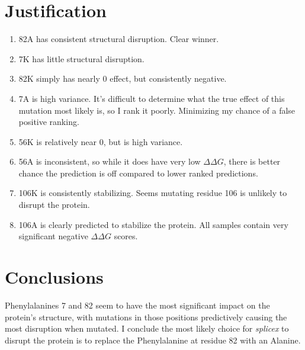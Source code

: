 \documentclass{article}
\begin{document}
\section*{Justification}
\begin{enumerate}
	\item 82A has consistent structural disruption. Clear winner.
	\item 7K has little structural disruption.
	\item 82K simply has nearly 0 effect, but consistently negative.
	\item 7A is high variance. It's difficult to determine what the true effect of this mutation most likely is, so I rank it poorly. Minimizing my chance of a false positive ranking.
	\item 56K is relatively near 0, but is high variance.
	\item 56A is inconsistent, so while it does have very low $\Delta \Delta G$, there is better chance the prediction is off compared to lower ranked predictions.
	\item 106K is consistently stabilizing. Seems mutating residue 106 is unlikely to disrupt the protein.
	\item 106A is clearly predicted to stabilize the protein. All samples contain very significant negative $\Delta\Delta G$ scores.
\end{enumerate}
\section*{Conclusions}
Phenylalanines 7 and 82 seem to have the most significant impact on the protein's structure, with mutations in those positions predictively causing the most disruption when mutated. I conclude the most likely choice for \textit{splicex} to disrupt the protein is to replace the Phenylalanine at residue 82 with an Alanine.
\printbibliography
\end{document}
